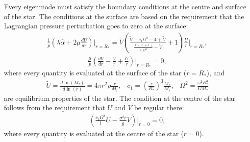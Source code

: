 \documentclass[fleqn,usenatbib]{mnras}
\begin{document}
Every eigenmode must satisfy the boundary conditions at the centre and surface of the star. The conditions at the surface are based on the requirement that the Lagrangian pressure perturbation goes to zero at the surface:
\begin{align}
\frac{1}{p}\left(\lambda\hat{\alpha}+2\mu\frac{dU}{dr}\right)\biggr\rvert_{r=R_{*}}=\tilde{V}\left(\frac{\tilde{V}-c_1\Omega^2-4+\tilde{U}}{\frac{\ell(\ell+1)}{c_1\Omega^2}-\tilde{V}}+1\right)\frac{U}{r}\biggr\rvert_{r=R_{*}},
\label{eq:surface_boundary_modified_1}
\end{align}
\begin{align}
\frac{\mu}{p}\left(\frac{dV}{dr}-\frac{V}{r}+\frac{U}{r}\right)\biggr\rvert_{r=R_{*}}=0,
\label{eq:surface_boundary_modified_2}
\end{align}
\noindent where every quantity is evaluated at the surface of the star ($r=R_*$), and 
\begin{align}\nonumber
\tilde{U}=\frac{d\ln\left(M_r\right)}{d\ln\left(r\right)}=4\pi r^2\rho\frac{r}{M_r},\;\;\;c_1=\left(\frac{r}{R_*}\right)^3\frac{M_*}{M_r},\;\;\;\Omega^2=\frac{\omega^2R_*^3}{GM_*}
\end{align}
\noindent are equilibrium properties of the star. The condition at the centre of the star follows from the requirement that $U$ and $V$ be regular there:
\begin{align}
\left(\frac{c_1\Omega^2}{l}U-\frac{\sigma^2r}{g}V\right)\biggr\rvert_{r=0}=0,
\label{eq:core_condition}
\end{align}
\noindent where every quantity is evaluated at the centre of the star ($r=0$).
\end{document}
